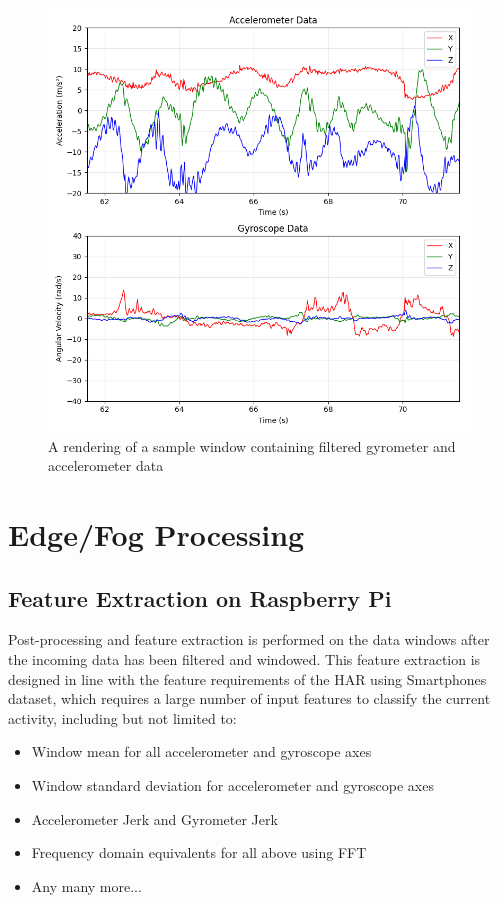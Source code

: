 \documentclass[conference]{IEEEtran}
\begin{document}
\begin{figure}[h]
	\centering
	\includegraphics[width=0.9\columnwidth]{media/Figure_1.png}
	\caption{A rendering of a sample window containing filtered gyrometer and accelerometer data}
	\label{fig:basic_data}
\end{figure}

\section{Edge/Fog Processing}
\subsection{Feature Extraction on Raspberry Pi}\label{feature_extraction}
Post-processing and feature extraction is performed on the data windows after the incoming data has been filtered and windowed. This feature extraction is designed in line with the feature requirements of the HAR using Smartphones dataset, which requires a large number of input features to classify the current activity, including but not limited to:
\begin{itemize}
	\item Window mean for all accelerometer and gyroscope axes
	\item Window standard deviation for accelerometer and gyroscope axes
	\item Accelerometer Jerk and Gyrometer Jerk
	\item Frequency domain equivalents for all above using FFT
	\item Any many more...
\end{itemize}
\end{document}
